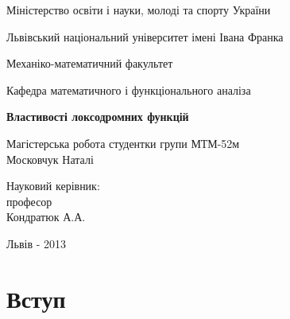 \documentclass[12pt,a4paper]{article}
\begin{document}

\pagestyle{empty}
\setlength{\parindent}{1.5cm}
\fontsize{14pt}{6mm}\selectfont

\begin{center}
  Міністерство освіти і науки, молоді та спорту України
  
  Львівський національний університет імені Івана Франка

  Механіко-математичний факультет
\end{center}

\vspace{1cm}

\begin{flushright}
  Кафедра математичного і функціонального аналіза
\end{flushright}

\vspace{4cm}

\begin{center}
  {\bfseries\Large Властивості локсодромних функцій}
\end{center}

\vspace{2cm}

\begin{small}
\begin{flushleft}
  Магістерська робота студентки 
  групи МТМ-52м\\
  Московчук Наталі\linebreak
  
  Науковий керівник:\\
  професор\\
  Кондратюк А.А.
\end{flushleft}
\end{small}

\vspace{4cm}

\begin{center}
  Львів - 2013 
\end{center}

\clearpage


\fontsize{14pt}{6mm}\selectfont

\tableofcontents
\clearpage
\pagestyle{plain}

\section{Вступ}
\end{document}

